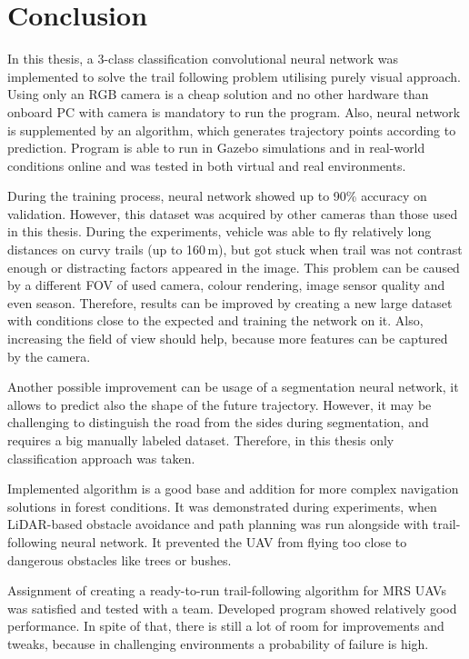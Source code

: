 \chapter{Conclusion}


In this thesis, a 3-class classification convolutional neural network was implemented to solve the trail following problem utilising purely visual approach. Using only an RGB camera is a cheap solution and no other hardware than onboard PC with camera is mandatory to run the program. Also, neural network is supplemented by an algorithm, which generates trajectory points according to prediction. Program is able to run in Gazebo simulations and in real-world conditions online and was tested in both virtual and real environments.

During the training process, neural network showed up to 90\% accuracy on validation. However, this dataset was acquired by other cameras than those used in this thesis. During the experiments, vehicle was able to fly relatively long distances on curvy trails (up to 160\,m), but got stuck when trail was not contrast enough or distracting factors appeared in the image. This problem can be caused by a different \acs{FOV} of used camera, colour rendering, image sensor quality and even season. Therefore, results can be improved by creating a new large dataset with conditions close to the expected and training the network on it. Also, increasing the field of view should help, because more features can be captured by the camera.

Another possible improvement can be usage of a segmentation neural network, it allows to predict also the shape of the future trajectory. However, it may be challenging to distinguish the road from the sides during segmentation, and requires a big manually labeled dataset. Therefore, in this thesis only classification approach was taken.

Implemented algorithm is a good base and addition for more complex navigation solutions in forest conditions. It was demonstrated during experiments, when \acs{LiDAR}-based obstacle avoidance and path planning was run alongside with trail-following neural network. It prevented the \acs{UAV} from flying too close to dangerous obstacles like trees or bushes.

Assignment of creating a ready-to-run trail-following algorithm for \acs{MRS} \acs{UAV}s was satisfied and tested with a team. Developed program showed relatively good performance. In spite of that, there is still a lot of room for improvements and tweaks, because in challenging environments a probability of failure is high.



